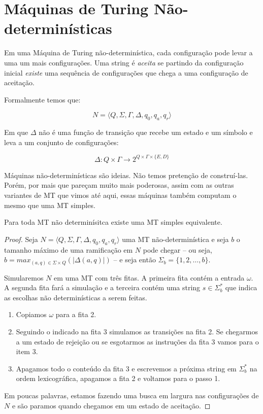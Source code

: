 \section{Máquinas de Turing Não-determinísticas}
\label{sec:mt-nd}

Em uma Máquina de Turing não-determinística, cada configuração pode levar a uma um mais configurações.
Uma string é {\em aceita} se partindo da configuração inicial {\em existe} uma sequência de configurações que chega a uma configuração de aceitação.

Formalmente temos que:

\begin{displaymath}
  N = \langle Q, \Sigma, \Gamma, \Delta, q_0, q_a, q_r \rangle
\end{displaymath}

Em que $\Delta$ não é uma função de transição que recebe um estado e um símbolo e leva a um conjunto de configurações:

\begin{displaymath}
  \Delta : Q \times \Gamma \to 2^{Q \times \Gamma \times \{E,D\}}
\end{displaymath}

Máquinas não-determinísticas são ideias.
Não temos pretenção de construí-las.
Porém, por mais que pareçam muito mais poderosas, assim com as outras variantes de MT que vimos até aqui, essas máquinas também computam o mesmo que uma MT simples.

\begin{theorem}
  Para toda MT não determinísitca existe uma MT simples equivalente.
\end{theorem}
\begin{proof}
  Seja $N = \langle Q, \Sigma, \Gamma, \Delta, q_0, q_a, q_r \rangle$ uma MT não-determinística e seja $b$ o tamanho máximo de uma ramificação em $N$ pode chegar -- ou seja, $b = max_{(a,q) \in \Sigma \times Q}(|\Delta(a,q)|)$ -- e seja então $\Sigma_b = \{1,2, \dots, b\}$.
  
  Simularemos $N$ em uma MT com três fitas.
  A primeira fita contém a entrada $\omega$.
  A segunda fita fará a simulação e a terceira contém uma string $s \in \Sigma_b^*$ que indica as escolhas não determinísticas a serem feitas.
  \begin{enumerate}
  \item Copiamos $\omega$ para a fita 2.
  \item Seguindo o indicado na fita 3 simulamos as transições na fita 2.
    Se chegarmos a um estado de rejeição ou se esgotarmos as instruções da fita 3 vamos para o item 3.
  \item Apagamos todo o conteúdo da fita 3 e escrevemos a próxima string em $\Sigma_b^*$ na ordem lexicográfica, apagamos a fita 2 e voltamos para o passo 1.
  \end{enumerate}

  Em poucas palavras, estamos fazendo uma busca em largura nas configurações de $N$ e são paramos quando chegamos em um estado de aceitação.
\end{proof}

